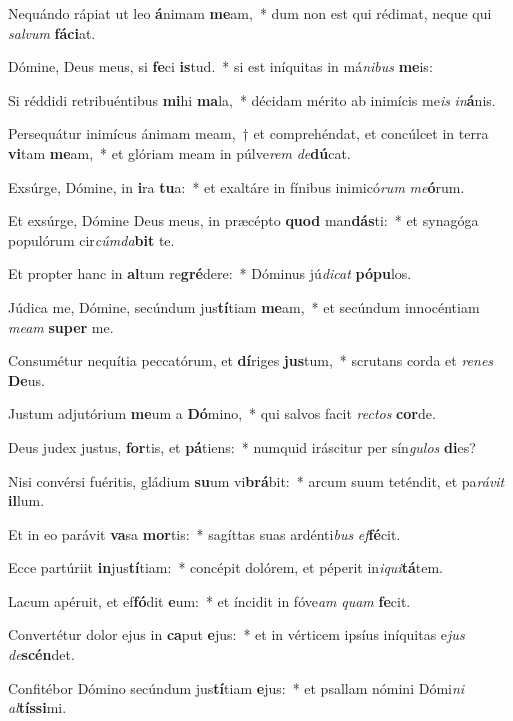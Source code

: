 \item Nequándo rápiat ut leo \textbf{á}nimam \textbf{me}am,~* dum non est qui rédimat, neque qui \textit{sal}\textit{vum} \textbf{fá}\textbf{ci}at.
\item Dómine, Deus meus, si \textbf{fe}ci \textbf{is}tud.~* si est iníquitas in má\textit{ni}\textit{bus} \textbf{me}is:
\item Si réddidi retribuéntibus \textbf{mi}hi \textbf{ma}la,~* décidam mérito ab inimícis me\textit{is} \textit{in}\textbf{á}nis.
\item Persequátur inimícus ánimam meam,~† et comprehéndat, et concúlcet in terra \textbf{vi}tam \textbf{me}am,~* et glóriam meam in púlve\textit{rem} \textit{de}\textbf{dú}cat.
\item Exsúrge, Dómine, in \textbf{i}ra \textbf{tu}a:~* et exaltáre in fínibus inimicó\textit{rum} \textit{me}\textbf{ó}rum.
\item Et exsúrge, Dómine Deus meus, in præcépto \textbf{quod} man\textbf{dás}ti:~* et synagóga populórum cir\textit{cúm}\textit{da}\textbf{bit} te.
\item Et propter hanc in \textbf{al}tum re\textbf{gré}dere:~* Dóminus jú\textit{di}\textit{cat} \textbf{pó}\textbf{pu}los.
\item Júdica me, Dómine, secúndum jus\textbf{tí}tiam \textbf{me}am,~* et secúndum innocéntiam \textit{me}\textit{am} \textbf{su}\textbf{per} me.
\item Consumétur nequítia peccatórum, et \textbf{dí}riges \textbf{jus}tum,~* scrutans corda et \textit{re}\textit{nes} \textbf{De}us.
\item Justum adjutórium \textbf{me}um a \textbf{Dó}mino,~* qui salvos facit \textit{rec}\textit{tos} \textbf{cor}de.
\item Deus judex justus, \textbf{for}tis, et \textbf{pá}tiens:~* numquid iráscitur per sín\textit{gu}\textit{los} \textbf{di}es?
\item Nisi convérsi fuéritis, gládium \textbf{su}um vi\textbf{brá}bit:~* arcum suum teténdit, et pa\textit{rá}\textit{vit} \textbf{il}lum.
\item Et in eo parávit \textbf{va}sa \textbf{mor}tis:~* sagíttas suas ardénti\textit{bus} \textit{ef}\textbf{fé}cit.
\item Ecce partúriit \textbf{in}jus\textbf{tí}tiam:~* concépit dolórem, et péperit in\textit{i}\textit{qui}\textbf{tá}tem.
\item Lacum apéruit, et ef\textbf{fó}dit \textbf{e}um:~* et íncidit in fóve\textit{am} \textit{quam} \textbf{fe}cit.
\item Convertétur dolor ejus in \textbf{ca}put \textbf{e}jus:~* et in vérticem ipsíus iníquitas e\textit{jus} \textit{de}\textbf{scén}det.
\item Confitébor Dómino secúndum jus\textbf{tí}tiam \textbf{e}jus:~* et psallam nómini Dómi\textit{ni} \textit{al}\textbf{tís}\textbf{si}mi.
